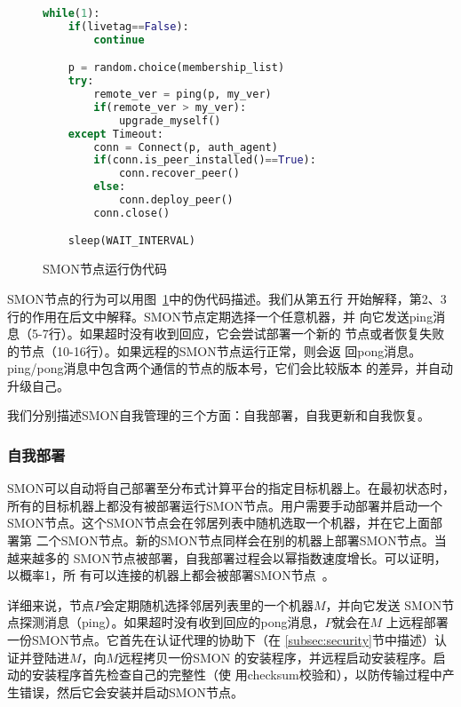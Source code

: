 \begin{figure}[bthp]
\centering
\begin{lstlisting}[language=Python,morekeywords={True,False},frame=tb,basicstyle=\small,numbers=right,numbersep=-5pt,numberstyle=\tiny]
while(1):
    if(livetag==False):
        continue

    p = random.choice(membership_list)
    try:
        remote_ver = ping(p, my_ver)
        if(remote_ver > my_ver):
            upgrade_myself()
    except Timeout:
        conn = Connect(p, auth_agent)
        if(conn.is_peer_installed()==True):
            conn.recover_peer()
        else:
            conn.deploy_peer()
        conn.close()

    sleep(WAIT_INTERVAL)
\end{lstlisting}
\caption{SMON节点运行伪代码}
\label{fig:peerflow}
\end{figure}

SMON节点的行为可以用图~\ref{fig:peerflow}中的伪代码描述。我们从第五行
开始解释，第2、3行的作用在后文中解释。SMON节点定期选择一个任意机器，并
向它发送ping消息（5-7行）。如果超时没有收到回应，它会尝试部署一个新的
节点或者恢复失败的节点（10-16行）。如果远程的SMON节点运行正常，则会返
回pong消息。ping/pong消息中包含两个通信的节点的版本号，它们会比较版本
的差异，并自动升级自己。

我们分别描述SMON自我管理的三个方面：自我部署，自我更新和自我恢复。

\subsubsection*{自我部署}


SMON可以自动将自己部署至分布式计算平台的指定目标机器上。在最初状态时，
所有的目标机器上都没有被部署运行SMON节点。用户需要手动部署并启动一个
SMON节点。这个SMON节点会在邻居列表中随机选取一个机器，并在它上面部署第
二个SMON节点。新的SMON节点同样会在别的机器上部署SMON节点。当越来越多的
SMON节点被部署，自我部署过程会以幂指数速度增长。可以证明，以概率1，所
有可以连接的机器上都会被部署SMON节点~\cite{Eugster2004}。

详细来说，节点$P$会定期随机选择邻居列表里的一个机器$M$，并向它发送
SMON节点探测消息（ping）。如果超时没有收到回应的pong消息，$P$就会在$M$
上远程部署一份SMON节点。它首先在认证代理的协助下（在
\ref{subsec:security}节中描述）认证并登陆进$M$，向$M$远程拷贝一份SMON
的安装程序，并远程启动安装程序。启动的安装程序首先检查自己的完整性（使
用checksum校验和），以防传输过程中产生错误，然后它会安装并启动SMON节点。

